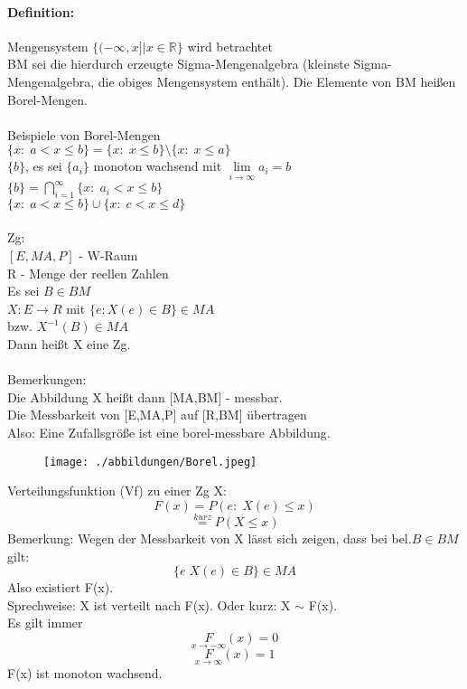 \documentclass[a4paper,12pt]{scrartcl}
\begin{document}
\paragraph{Definition:} Mengensystem $\{(-\infty,x]|x\in\mathbb{R}\}$ wird betrachtet\\
BM sei die hierdurch erzeugte Sigma-Mengenalgebra (kleinste Sigma-Mengenalgebra, die obiges Mengensystem enthält). Die Elemente von BM heißen Borel-Mengen.\\
\\
Beispiele von Borel-Mengen\\
$\{x:\;a<x\leq b\} = \{x:\;x\leq b\}\setminus \{x:\;x\leq a\} $\\
$\{b\}$, es sei $\{a_i\}$ monoton wachsend mit $\underset{i\rightarrow\infty}{\lim}a_i = b$\\
$\{b\} = \bigcap^\infty_{i=1}\{x:\; a_i<x\leq b\}$\\
$\{x:\;a<x\leq b\}\cup \{x: \; c<x\leq d\}$\\
\\
Zg:\\
$[E,MA,P]$ - W-Raum\\
R - Menge der reellen Zahlen\\
Es sei $B\in BM$\\
$X: E\rightarrow R$ mit $\{e: X(e)\in B\}\in MA$ \\
bzw. $X^{-1}(B) \in MA$\\
Dann heißt X eine Zg.\\
\\
Bemerkungen:\\
Die Abbildung X heißt dann [MA,BM] - messbar.\\
Die Messbarkeit von [E,MA,P] auf [R,BM] übertragen\\
Also: Eine Zufallsgröße ist eine borel-messbare Abbildung.\\

  \begin{figure}[h]
    \texttt{[image: ./abbildungen/Borel.jpeg]}
  \end{figure}

Verteilungsfunktion (Vf) zu einer Zg X:
$$F(x) = P(e:\;X(e)\leq x)$$
$$ \overset{kurz}{=} P(X\leq x)$$
Bemerkung: Wegen der Messbarkeit von X lässt sich zeigen, dass bei bel.$B\in BM$ gilt:\\
$$\{e\;X(e)\in B\}\in MA$$
Also existiert F(x).\\
Sprechweise: X ist verteilt nach F(x). Oder kurz: X $\sim$ F(x).\\
Es gilt immer
$$\underset{x\rightarrow-\infty}F(x) = 0$$
$$\underset{x\rightarrow\infty}F(x) = 1$$
F(x) ist monoton wachsend.\\
\end{document}
